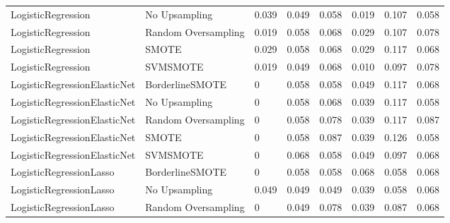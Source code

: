 \begin{tabular}{llllllll}
          LogisticRegression &       No Upsampling & 0.039 &                     0.049 &                 0.058 &                  0.019 &                                   0.107 &    0.058 \\
          LogisticRegression & Random Oversampling & 0.019 &                     0.058 &                 0.068 &                  0.029 &                                   0.107 &    0.078 \\
          LogisticRegression &               SMOTE & 0.029 &                     0.058 &                 0.068 &                  0.029 &                                   0.117 &    0.068 \\
          LogisticRegression &            SVMSMOTE & 0.019 &                     0.049 &                 0.068 &                  0.010 &                                   0.097 &    0.078 \\
LogisticRegressionElasticNet &     BorderlineSMOTE &     0 &                     0.058 &                 0.058 &                  0.049 &                                   0.117 &    0.068 \\
LogisticRegressionElasticNet &       No Upsampling &     0 &                     0.058 &                 0.068 &                  0.039 &                                   0.117 &    0.058 \\
LogisticRegressionElasticNet & Random Oversampling &     0 &                     0.058 &                 0.078 &                  0.039 &                                   0.117 &    0.087 \\
LogisticRegressionElasticNet &               SMOTE &     0 &                     0.058 &                 0.087 &                  0.039 &                                   0.126 &    0.058 \\
LogisticRegressionElasticNet &            SVMSMOTE &     0 &                     0.068 &                 0.058 &                  0.049 &                                   0.097 &    0.068 \\
     LogisticRegressionLasso &     BorderlineSMOTE &     0 &                     0.058 &                 0.058 &                  0.068 &                                   0.058 &    0.068 \\
     LogisticRegressionLasso &       No Upsampling & 0.049 &                     0.049 &                 0.049 &                  0.039 &                                   0.058 &    0.068 \\
     LogisticRegressionLasso & Random Oversampling &     0 &                     0.049 &                 0.078 &                  0.039 &                                   0.087 &    0.068 \\

\end{tabular}
